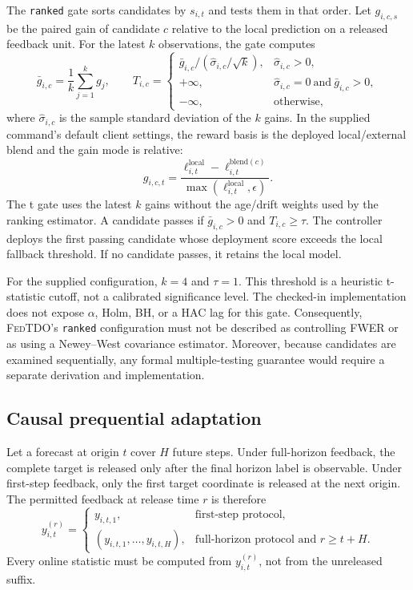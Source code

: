 \documentclass{article}
\newcommand{\method}{\textsc{FedTDO}}
\theoremstyle{definition}
\begin{document}
The \texttt{ranked} gate sorts candidates by \(s_{i,t}\) and tests them in that order. Let \(g_{i,c,s}\) be the paired gain of candidate \(c\) relative to the local prediction on a released feedback unit. For the latest \(k\) observations, the gate computes
\begin{equation}
\bar g_{i,c}=\frac{1}{k}\sum_{j=1}^{k}g_j,\qquad
 T_{i,c}=
 \begin{cases}
 \bar g_{i,c}/(\hat{\sigma}_{i,c}/\sqrt{k}), & \hat{\sigma}_{i,c}>0,\\
 +\infty, & \hat{\sigma}_{i,c}=0\ \text{and}\ \bar g_{i,c}>0,\\
 -\infty, & \text{otherwise},
 \end{cases}
 \label{eq:ttest}
\end{equation}
where \(\hat{\sigma}_{i,c}\) is the sample standard deviation of the \(k\) gains. In the supplied command's default client settings, the reward basis is the deployed local/external blend and the gain mode is relative:
\[
 g_{i,c,t}
 =
 \frac{\ell_{i,t}^{\mathrm{local}}-\ell_{i,t}^{\mathrm{blend}(c)}}
      {\max(\ell_{i,t}^{\mathrm{local}},\epsilon)}.
\]
The t gate uses the latest \(k\) gains without the age/drift weights used by the ranking estimator. A candidate passes if \(\bar g_{i,c}>0\) and \(T_{i,c}\ge \tau\). The controller deploys the first passing candidate whose deployment score exceeds the local fallback threshold. If no candidate passes, it retains the local model.

For the supplied configuration, \(k=4\) and \(\tau=1\). This threshold is a heuristic t-statistic cutoff, not a calibrated significance level. The checked-in implementation does not expose \(\alpha\), Holm, BH, or a HAC lag for this gate. Consequently, \method's \texttt{ranked} configuration must not be described as controlling FWER or as using a Newey--West covariance estimator. Moreover, because candidates are examined sequentially, any formal multiple-testing guarantee would require a separate derivation and implementation.

\subsection{Causal prequential adaptation}

Let a forecast at origin \(t\) cover \(H\) future steps. Under full-horizon feedback, the complete target is released only after the final horizon label is observable. Under first-step feedback, only the first target coordinate is released at the next origin. The permitted feedback at release time \(r\) is therefore
\begin{equation}
y_{i,t}^{(r)}
 =
 \begin{cases}
 y_{i,t,1}, & \text{first-step protocol},\\
 (y_{i,t,1},\ldots,y_{i,t,H}), & \text{full-horizon protocol and }r\ge t+H.
 \end{cases}
 \label{eq:prefix}
\end{equation}
Every online statistic must be computed from \(y_{i,t}^{(r)}\), not from the unreleased suffix.
\end{document}
